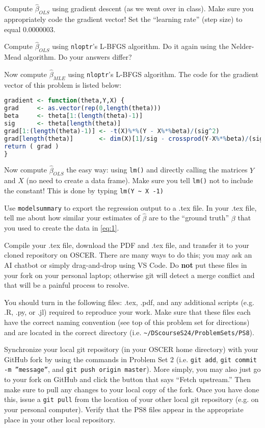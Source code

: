 \documentclass[12pt,english]{exam}
\begin{document}
\begin{questions}
\question Compute $\hat{\beta}_{OLS}$ using gradient descent (as we went over in class). Make sure you appropriately code the gradient vector! Set the ``learning rate'' (step size) to equal 0.0000003.

\question Compute $\hat{\beta}_{OLS}$ using \texttt{nloptr}'s L-BFGS algorithm. Do it again using the Nelder-Mead algorithm. Do your answers differ?

\question Now compute $\hat{\beta}_{MLE}$ using \texttt{nloptr}'s L-BFGS algorithm. The code for the gradient vector of this problem is listed below:
\begin{lstlisting}[language=R]
gradient <- function(theta,Y,X) {
grad     <- as.vector(rep(0,length(theta)))
beta     <- theta[1:(length(theta)-1)]
sig      <- theta[length(theta)]
grad[1:(length(theta)-1)] <- -t(X)%*%(Y - X%*%beta)/(sig^2)
grad[length(theta)]       <- dim(X)[1]/sig - crossprod(Y-X%*%beta)/(sig^3)
return ( grad )
}
\end{lstlisting}

\question Now compute $\hat{\beta}_{OLS}$ the easy way: using \texttt{lm()} and directly calling the matrices $Y$ and $X$ (no need to create a data frame). Make sure you tell \texttt{lm()} not to include the constant! This is done by typing \texttt{lm(Y \textasciitilde{} X -1)}

Use \texttt{modelsummary} to export the regression output to a .tex file. In your .tex file, tell me about how similar your estimates of $\hat{\beta}$ are to the ``ground truth'' $\beta$ that you used to create the data in \eqref{eq:1}.

\question Compile your .tex file, download the PDF and .tex file, and transfer it to your cloned repository on OSCER. There are many ways to do this;  you may ask an AI chatbot or simply drag-and-drop using VS Code. Do \textbf{not} put these files in your fork on your personal laptop; otherwise git will detect a merge conflict and that will be a painful process to resolve.

\question You should turn in the following files: .tex, .pdf, and any additional scripts (e.g. .R, .py, or .jl) required to reproduce your work.  Make sure that these files each have the correct naming convention (see top of this problem set for directions) and are located in the correct directory (i.e. \texttt{\textasciitilde/DScourseS24/ProblemSets/PS8}).

\question Synchronize your local git repository (in your OSCER home directory) with your GitHub fork by using the commands in Problem Set 2 (i.e. \texttt{git add}, \texttt{git commit -m ''message''}, and \texttt{git push origin master}). More simply, you may also just go to your fork on GitHub and click the button that says ``Fetch upstream.'' Then make sure to pull any changes to your local copy of the fork. Once you have done this, issue a \texttt{git pull} from the location of your other local git repository (e.g. on your personal computer). Verify that the PS8 files appear in the appropriate place in your other local repository.

\end{questions}
\end{document}
